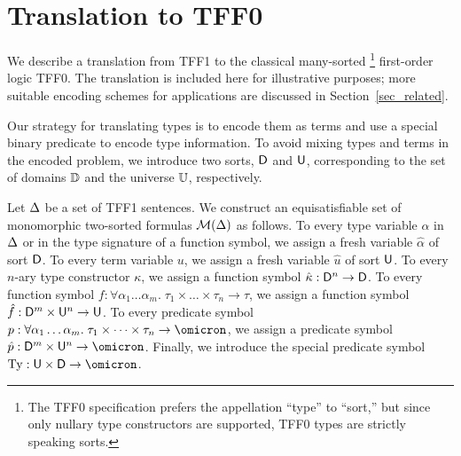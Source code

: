 \section{Translation to TFF0} \label{sec_trans}

We describe a translation from TFF1 to the classical many-sorted%
\footnote{The TFF0 specification \cite{sutcliffe-et-al-2011-tff0} prefers the
appellation ``type'' to ``sort,'' but since only nullary type constructors are
supported, TFF0 types are strictly speaking sorts.}
first-order logic TFF0.
The translation is included here for illustrative purposes; more suitable
encoding schemes for applications are discussed in
Section~\ref{sec_related}.

Our strategy for translating types is to encode them as terms and
use a special binary predicate to encode type information.
%
To avoid mixing types
and terms in the encoded problem, we introduce two sorts, $\mathsf{D}$ and $\mathsf{U}$,
corresponding to the set of domains $\mathbb{D}$ and the universe $\mathbb{U}$,
respectively.

Let $\mathrm{\Delta}$ be a set of TFF1 sentences.
We construct an equisatisfiable set of monomorphic two-sorted
formulas $\mathcal{M}(\mathrm{\Delta})$ as follows.
%
To every type variable $\alpha$ in $\mathrm{\Delta}$ or in the type signature of a function
symbol, we assign a fresh variable $\hat{\alpha}$ of sort $\mathsf{D}$.
To every term variable $u$, we assign
a fresh variable $\hat{u}$ of sort $\mathsf{U}$.
To every $n$-ary type constructor $\kappa$, we assign
a function symbol $\hat{\kappa} : \mathsf{D}^n \to \mathsf{D}$.
To every function symbol $f : \forall \alpha_1\dots\alpha_m .\; \tau_1 \times \dots \times \tau_n \to \tau$,
we assign a function symbol $\hat{f} : \mathsf{D}^m \times \mathsf{U}^n \to \mathsf{U}$.
To every predicate symbol $p : \forall \alpha_1\dots\alpha_m .\; \tau_1 \times \dots \times \tau_n \to \omicron$,
we assign a predicate symbol $\hat{p} : \typ^m \times \und^n \to \omicron$.
Finally, we introduce the special predicate symbol $\typeof : \und \times \typ \to \omicron$.


